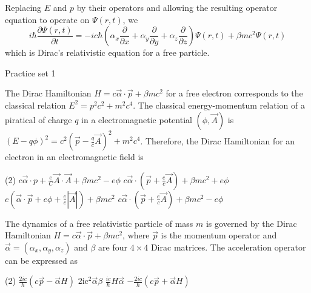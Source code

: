 Replacing $E$ and $p$ by their operators and allowing the resulting operator equation to operate on $\Psi(r, t)$, we
$$i \hbar \frac{\partial \Psi(r, t)}{\partial t}=-i c \hbar\left(\alpha_{x} \frac{\partial}{\partial x}+\alpha_{y} \frac{\partial}{\partial y}+\alpha_{z} \frac{\partial}{\partial z}\right) \Psi(r, t)+\beta m c^{2} \Psi(r, t)$$
which is Dirac's relativistic equation for a free particle.
\newpage
\begin{abox}
	Practice set 1
	\end{abox}
\begin{enumerate}
	\begin{minipage}{\textwidth}
		\item The Dirac Hamiltonian $H=c \vec{\alpha} \cdot \vec{p}+\beta m c^{2}$ for a free electron corresponds to the classical relation $E^{2}=p^{2} c^{2}+m^{2} c^{4}$. The classical energy-momentum relation of a piratical of charge $q$ in a electromagnetic potential $(\phi, \vec{A})$ is $(E-q \phi)^{2}=c^{2}\left(\vec{p}-\frac{q}{c} \vec{A}\right)^{2}+m^{2} c^{4}$.
		Therefore, the Dirac Hamiltonian for an electron in an electromagnetic field is
	\end{minipage}
	\begin{tasks}(2)
		\task[\textbf{A.}] $c \vec{\alpha} \cdot p+\frac{e}{C} \vec{A} \cdot \vec{A}+\beta m c^{2}-e \phi$
		\task[\textbf{B.}]$c \vec{\alpha} \cdot\left(\vec{p}+\frac{e}{c} \vec{A}\right)+\beta m c^{2}+e \phi$
		\task[\textbf{C.}]$c\left(\vec{\alpha} \cdot \vec{p}+e \phi+\frac{e}{c}|\vec{A}|\right)+\beta m c^{2}$
		\task[\textbf{D.}]$c \vec{\alpha} \cdot\left(\vec{p}+\frac{e}{c} \vec{A}\right)+\beta m c^{2}-e \phi$
	\end{tasks}
\begin{minipage}{\textwidth}
	\item The dynamics of a free relativistic particle of mass $m$ is governed by the Dirac Hamiltonian $H=c \vec{\alpha} \cdot \vec{p}+\beta m c^{2}$, where $\vec{p}$ is the momentum operator and $\vec{\alpha}=\left(\alpha_{x}, \alpha_{y}, \alpha_{z}\right)$ and $\beta$ are four $4 \times 4$ Dirac matrices. The acceleration operator can be expressed as
\end{minipage}
\begin{tasks}(2)
	\task[\textbf{A.}] $\frac{2 i c}{\hbar}(c \vec{p}-\vec{\alpha} H)$
	\task[\textbf{B.}]$2 \mathrm{ic}^{2} \vec{\alpha} \beta$
	\task[\textbf{C.}]$\frac{i c}{\hbar} H \vec{\alpha}$
	\task[\textbf{D.}]$-\frac{2 i c}{\hbar}(c \vec{p}+\vec{\alpha} H)$
\end{tasks}
\end{enumerate}
